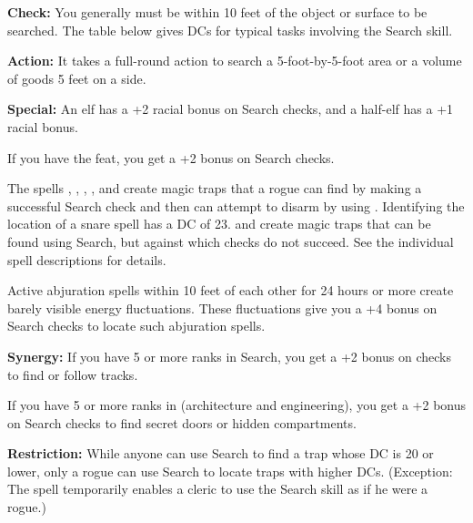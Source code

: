 \textbf{Check:} You generally must be within 10 feet of the object or surface to be searched. The table below gives DCs for typical tasks involving the Search skill.

\textbf{Action:} It takes a full-round action to search a 5-foot-by-5-foot area or a volume of goods 5 feet on a side.

\textbf{Special:} An elf has a +2 racial bonus on Search checks, and a half-elf has a +1 racial bonus.

If you have the  feat, you get a +2 bonus on Search checks.

The spells , , , , and  create magic traps that a rogue can find by making a successful Search check and then can attempt to disarm by using . Identifying the location of a snare spell has a DC of 23.  and  create magic traps that can be found using Search, but against which  checks do not succeed. See the individual spell descriptions for details.

Active abjuration spells within 10 feet of each other for 24 hours or more create barely visible energy fluctuations. These fluctuations give you a +4 bonus on Search checks to locate such abjuration spells.

\textbf{Synergy:} If you have 5 or more ranks in Search, you get a +2 bonus on  checks to find or follow tracks.

If you have 5 or more ranks in  (architecture and engineering), you get a +2 bonus on Search checks to find secret doors or hidden compartments.

\textbf{Restriction:} While anyone can use Search to find a trap whose DC is 20 or lower, only a rogue can use Search to locate traps with higher DCs. (Exception: The spell  temporarily enables a cleric to use the Search skill as if he were a rogue.)